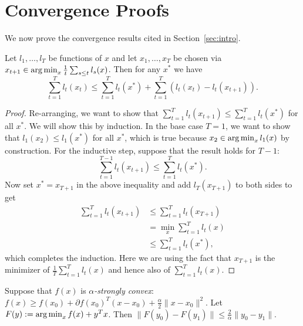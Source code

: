 \documentclass{article}
\begin{document}
\section{Convergence Proofs}
\label{sec:proofs}
We now prove the convergence results cited in Section~\ref{sec:intro}.
\begin{lemma}
\label{lem:ftl}
Let $l_1,\ldots,l_T$ be functions of $x$ and let $x_1,\ldots,x_T$ 
be chosen via $x_{t+1} \in \argmin_{x} \frac{1}{t} \sum_{s \leq t} l_s(x)$. 
Then for any $x^*$ we have
\[ \sum_{t=1}^T l_t(x_t) \leq \sum_{t=1}^T l_t(x^*) + \sum_{t=1}^T (l_t(x_t) - l_t(x_{t+1})). \]
\end{lemma}
\begin{proof}
Re-arranging, we want to show that $\sum_{t=1}^T l_t(x_{t+1}) \leq \sum_{t=1}^T l_t(x^*)$ for 
all $x^*$. We will show this by induction. In the base case $T=1$, we want to show that $l_1(x_2) \leq l_1(x^*)$ 
for all $x^*$, which is true because $x_2 \in \argmin_x l_1(x)$ by construction. For 
the inductive step, suppose that the result holds for $T-1$:
\[ \sum_{t=1}^{T-1} l_t(x_{t+1}) \leq \sum_{t=1}^T l_t(x^*). \]
Now set $x^* = x_{T+1}$ in the above inequality and 
add $l_T(x_{T+1})$ to both sides to get
\begin{align*}
\sum_{t=1}^T l_t(x_{t+1}) &\leq \sum_{t=1}^T l_t(x_{T+1}) \\
 &= \min_{x} \sum_{t=1}^T l_t(x) \\
 &\leq \sum_{t=1}^T l_t(x^*),
\end{align*}
which completes the induction. Here we are using the fact that $x_{T+1}$ 
is the minimizer of $\frac{1}{T} \sum_{t=1}^T l_t(x)$ and hence also of 
$\sum_{t=1}^T l_t(x)$.
\end{proof}
\begin{lemma} \label{lem:convexity}
Suppose that $f(x)$ is \emph{$\alpha$-strongly convex}: $f(x) \geq f(x_0) + \partial f(x_0)^T(x-x_0) + \frac{\alpha}{2}\|x-x_0\|^2$. 
Let $F(y) := \argmin_x f(x) + y^Tx$. Then $\|F(y_0)-F(y_1)\| \leq \frac{2}{\alpha} \|y_0-y_1\|$.
\end{lemma}
\end{document}

